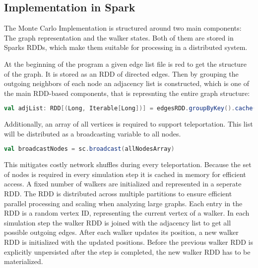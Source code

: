 \subsection{Implementation in Spark}
The Monte Carlo Implementation is structured around two main components: The graph representation and the walker states. Both of them are stored in Sparks RDDs, which make them suitable for processing in a distributed system.

At the beginning of the program a given edge list file is red to get the structure of the graph. It is stored as an RDD of directed edges. Then by grouping the outgoing neighbors of each node an adjacency list is constructed, which is one of the main RDD-based components, that is represnting the entire graph structure:

\vspace{0.5em}
\begin{lstlisting}[language=Scala, caption={Adjacency list creation}, label={lst:adjlist}]
val adjList: RDD[(Long, Iterable[Long])] = edgesRDD.groupByKey().cache()
\end{lstlisting}
\vspace{0.5em}

Additionally, an array of all vertices is required to support teleportation. This list will be distributed as a broadcasting variable to all nodes.

\vspace{0.5em}
\begin{lstlisting}[language=Scala, caption={Broadcasting Variable}, label={lst:broadcast}]
val broadcastNodes = sc.broadcast(allNodesArray)
\end{lstlisting}
\vspace{0.5em}

This mitigates costly network shuffles during every teleportation. Because the set of nodes is required in every simulation step it is cached in memory for efficient access.
A fixed number of walkers are initialized and represented in a seperate RDD. The RDD is distributed across multiple partitions to ensure efficient parallel processing and scaling when analyzing large graphs. Each entry in the RDD is a random vertex ID, representing the current vertex of a walker. In each simulation step the walker RDD is joined with the adjacency list to get all possible outgoing edges. After each walker updates its position, a new walker RDD is initialized with the updated positions. Before the previous walker RDD is explicitly unpersisted after the step is completed, the new walker RDD has to be materialized.

